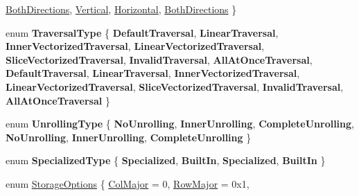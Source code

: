 \begin{DoxyCompactItemize}
\hyperlink{group__enums_ggad49a7b3738e273eb00932271b36127f7aa01e40fce022901560ce6d9fdee2fde3}{Both\+Directions}, 
\hyperlink{group__enums_ggad49a7b3738e273eb00932271b36127f7addca718e0564723df21d61b94b1198be}{Vertical}, 
\newline
\hyperlink{group__enums_ggad49a7b3738e273eb00932271b36127f7aae8a16b3b9272683c1162915f6d892be}{Horizontal}, 
\hyperlink{group__enums_ggad49a7b3738e273eb00932271b36127f7aa01e40fce022901560ce6d9fdee2fde3}{Both\+Directions}
 \}
\item 
\mbox{\label{namespace_eigen_a3d2409f30bc18e288e66de7ac53f71e5}} 
enum {\bfseries Traversal\+Type} \{ \newline
{\bfseries Default\+Traversal}, 
{\bfseries Linear\+Traversal}, 
{\bfseries Inner\+Vectorized\+Traversal}, 
{\bfseries Linear\+Vectorized\+Traversal}, 
\newline
{\bfseries Slice\+Vectorized\+Traversal}, 
{\bfseries Invalid\+Traversal}, 
{\bfseries All\+At\+Once\+Traversal}, 
{\bfseries Default\+Traversal}, 
\newline
{\bfseries Linear\+Traversal}, 
{\bfseries Inner\+Vectorized\+Traversal}, 
{\bfseries Linear\+Vectorized\+Traversal}, 
{\bfseries Slice\+Vectorized\+Traversal}, 
\newline
{\bfseries Invalid\+Traversal}, 
{\bfseries All\+At\+Once\+Traversal}
 \}
\item 
\mbox{\label{namespace_eigen_ab8c7299b77156ae8c7827ba61787669d}} 
enum {\bfseries Unrolling\+Type} \{ \newline
{\bfseries No\+Unrolling}, 
{\bfseries Inner\+Unrolling}, 
{\bfseries Complete\+Unrolling}, 
{\bfseries No\+Unrolling}, 
\newline
{\bfseries Inner\+Unrolling}, 
{\bfseries Complete\+Unrolling}
 \}
\item 
\mbox{\label{namespace_eigen_a8f4ff3ed63ee9637dda3fedea4bba1ea}} 
enum {\bfseries Specialized\+Type} \{ {\bfseries Specialized}, 
{\bfseries Built\+In}, 
{\bfseries Specialized}, 
{\bfseries Built\+In}
 \}
\item 
enum \hyperlink{group__enums_gaacded1a18ae58b0f554751f6cdf9eb13}{Storage\+Options} \{ \newline
\hyperlink{group__enums_ggaacded1a18ae58b0f554751f6cdf9eb13a0cbd4bdd0abcfc0224c5fcb5e4f6669a}{Col\+Major} = 0, 
\hyperlink{group__enums_ggaacded1a18ae58b0f554751f6cdf9eb13acfcde9cd8677c5f7caf6bd603666aae3}{Row\+Major} = 0x1, 

\end{DoxyCompactItemize}
